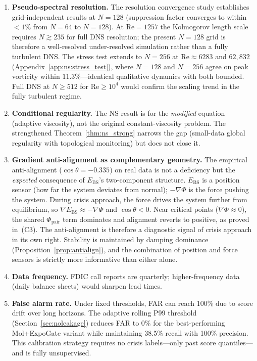 \documentclass[final]{siamltex}
\providecommand{\grad}{\nabla}
\newcommand{\Ebs}{E_{\mathrm{BS}}}
\newcommand{\costheta}{\cos\theta}
\begin{document}
\begin{enumerate}
\item \textbf{Pseudo-spectral resolution.} The resolution
  convergence study establishes grid-independent results at
  $N=128$ (suppression factor converges to within $<1\%$ from
  $N=64$ to $N=128$).  At $\mathrm{Re}=1257$ the Kolmogorov length
  scale requires $N\gtrsim 235$ for full DNS resolution; the
  present $N=128$ grid is therefore a well-resolved
  under-resolved simulation rather than a fully turbulent DNS.
  The stress test extends to $N=256$ at $\mathrm{Re}\approx
  6283$ and $62{,}832$ (Appendix~\ref{app:ns:stress_test}),
  where $N=128$ and $N=256$ agree on peak vorticity within
  $11.3\%$---identical qualitative dynamics with both bounded.
  Full DNS at $N \ge 512$ for $\mathrm{Re} \ge 10^4$
  would confirm the scaling trend in the fully turbulent regime.

\item \textbf{Conditional regularity.} The NS result is for the
  \emph{modified} equation (adaptive viscosity), not the original
  constant-viscosity problem.  The strengthened
  Theorem~\ref{thm:ns_strong} narrows the gap (small-data global
  regularity with topological monitoring) but does not close it.

\item \textbf{Gradient anti-alignment as complementary geometry.}
  The empirical anti-alignment ($\costheta=-0.335$) on real data
  is not a deficiency but the \emph{expected} consequence of
  $\Ebs$'s two-component structure.  $\Ebs$ is a position sensor
  (how far the system deviates from normal); $-\grad\Phi$ is the
  force pushing the system.  During crisis approach, the force drives
  the system further from equilibrium, so $\grad\Ebs \approx -\grad\Phi$
  and $\costheta < 0$.  Near critical points ($\grad\Phi \approx 0$),
  the shared $\Phi_{\mathrm{pair}}$ term dominates and alignment
  reverts to positive, as proved in~(C3).  The anti-alignment
  is therefore a diagnostic signal of crisis approach in its own
  right.  Stability is maintained by damping dominance
  (Proposition~\ref{prop:antialign}), and the combination of
  position and force sensors is strictly more informative than
  either alone.

\item \textbf{Data frequency.} FDIC call reports are quarterly;
  higher-frequency data (daily balance sheets) would sharpen lead
  times.

\item \textbf{False alarm rate.} Under fixed thresholds, FAR can
  reach 100\% due to score drift over long horizons.  The adaptive
  rolling P99 threshold (Section~\ref{sec:noleakage}) reduces FAR
  to 0\% for the best-performing Mol+ExpoGate variant while
  maintaining 38.5\% recall with 100\% precision.  This calibration
  strategy requires no crisis labels---only past score
  quantiles---and is fully unsupervised.


\end{enumerate}
\end{document}
